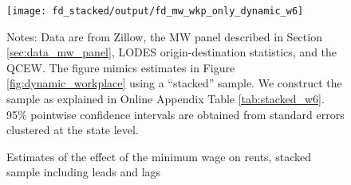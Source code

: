 
\begin{figure}[h!]
    \centering
    \caption{Estimates of the effect of the minimum wage on rents, stacked sample including
             leads and lags}
    \label{fig:dynamic_stacked}

    \texttt{[image: fd\_stacked/output/fd\_mw\_wkp\_only\_dynamic\_w6]}

    \begin{minipage}{.95\textwidth} \footnotesize
        \vspace{3mm}
        Notes:
        Data are from Zillow,
        the MW panel described in Section \ref{sec:data_mw_panel},
        LODES origin-destination statistics,
        and the QCEW.
        The figure mimics estimates in Figure \ref{fig:dynamic_workplace} 
        using a ``stacked'' sample.
        We construct the sample as explained in Online Appendix Table 
        \ref{tab:stacked_w6}.
        95\% pointwise confidence intervals are obtained from standard errors 
        clustered at the state level.
    \end{minipage}
\end{figure}
